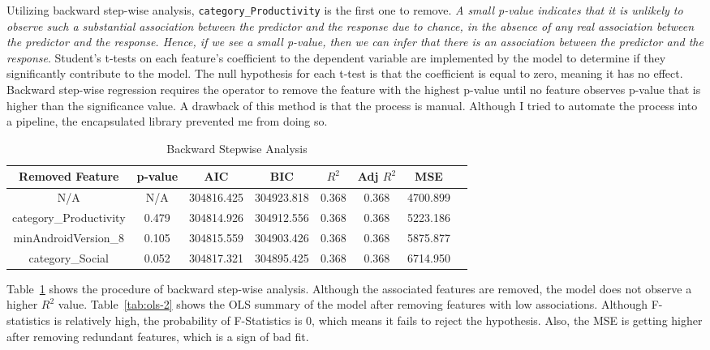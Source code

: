 Utilizing backward step-wise analysis, \texttt{category\_Productivity} is the first one to remove.\textit{ A small p-value indicates that it is unlikely to observe such a substantial association between the predictor and the response due to chance, in the absence of any real association between the predictor and the response. Hence, if we see a small p-value, then we can infer that there is an association between the predictor and the response}\cite{james2023introduction}. Student's t-tests on each feature's coefficient to the dependent variable are implemented by the model to determine if they significantly contribute to the model. The null hypothesis for each t-test is that the coefficient is equal to zero, meaning it has no effect. Backward step-wise regression requires the operator to remove the feature with the highest p-value until no feature observes p-value that is higher than the significance value. A drawback of this method is that the process is manual. Although I tried to automate the process into a pipeline, the encapsulated library prevented me from doing so.

\begin{center}
    \begin{table}[]
        \centering
        \scriptsize
            \begin{tabular}{cccccccc}
                \hline
                 Removed Feature & p-value & AIC & BIC & $R^2$ & Adj $R^2$ & MSE \\
                \hline
                N/A & N/A & 304816.425 & 304923.818 & 0.368 & 0.368 & 4700.899 \\
                category\_Productivity & 0.479 & 304814.926 & 304912.556 & 0.368 & 0.368 & 5223.186 \\
                minAndroidVersion\_8 & 0.105 & 304815.559 & 304903.426 & 0.368 & 0.368 & 5875.877 \\
                category\_Social & 0.052 & 304817.321 & 304895.425 & 0.368 & 0.368 & 6714.950 \\
                \hline
            \end{tabular}
        \caption{Backward Stepwise Analysis}
        \label{tab:backwise}
    \end{table}
\end{center}

Table~\ref{tab:backwise} shows the procedure of backward step-wise analysis. Although the associated features are removed, the model does not observe a higher $R^2$ value. Table~\ref{tab:ols-2} shows the OLS summary of the model after removing features with low associations. Although F-statistics is relatively high, the probability of F-Statistics is 0, which means it fails to reject the hypothesis. Also, the MSE is getting higher after removing redundant features, which is a sign of bad fit.

